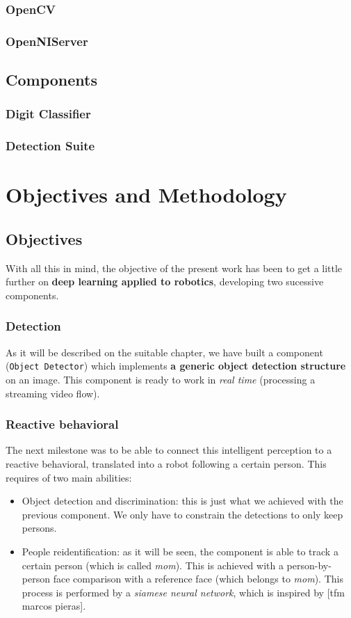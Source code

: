 		\subsection{OpenCV}
		\subsection{OpenNIServer}
	\section{Components}
		\subsection{Digit Classifier}
		\subsection{Detection Suite}

\chapter{Objectives and Methodology}

\section{Objectives}
With all this in mind, the objective of the present work has been to get a little further on \textbf{deep learning applied to robotics}, developing two sucessive components.
\subsection{Detection}
As it will be described on the suitable chapter, we have built a component (\texttt{Object Detector}) which implements \textbf{a generic object detection structure} on an image. This component is ready to work in \emph{real time} (processing a streaming video flow).\\

\subsection{Reactive behavioral}

The next milestone was to be able to connect this intelligent perception to a reactive behavioral, translated into a robot following a certain person. This requires of two main abilities:
\begin{itemize}
	\item Object detection and discrimination: this is just what we achieved with the previous component. We only have to constrain the detections to only keep persons.
	\item People reidentification: as it will be seen, the component is able to track a certain person (which is called \emph{mom}). This is achieved with a person-by-person face comparison with a reference face (which belongs to \emph{mom}). This process is performed by a \emph{siamese neural network}, which is inspired by [tfm marcos pieras].
\end{itemize}

